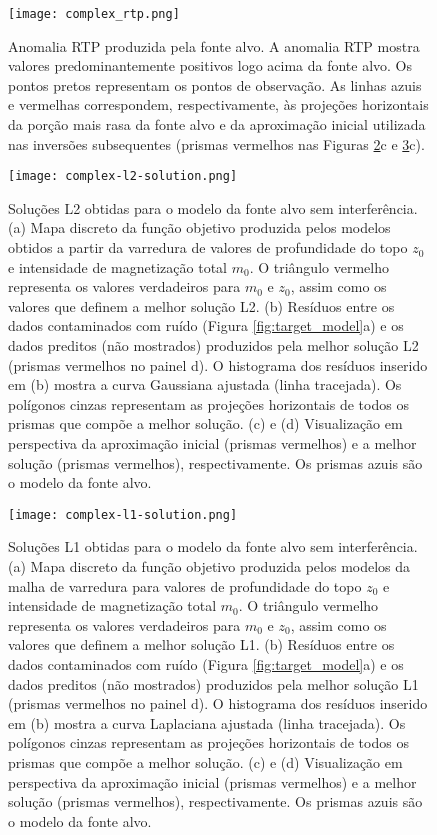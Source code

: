 \begin{figure}[!htb]
	\centering
	\texttt{[image: complex\_rtp.png]}
	\caption{Anomalia RTP produzida pela fonte alvo. 
		A anomalia RTP mostra valores predominantemente positivos logo acima da fonte alvo. Os pontos pretos representam os pontos de observação. As linhas azuis e vermelhas correspondem, respectivamente, às projeções horizontais da porção mais rasa da fonte alvo e da aproximação inicial utilizada nas inversões subsequentes (prismas vermelhos nas Figuras \ref{fig:target_l2_result}c e 
		\ref{fig:target_l1_result}c).
	}
	\label{fig:target_model_rtp}
\end{figure}

\pagebreak

\begin{figure}[!htb]
	\centering
	\texttt{[image: complex-l2-solution.png]}
	\caption{Soluções L2 obtidas para o modelo da fonte alvo sem interferência. 
		(a) Mapa discreto da função objetivo produzida pelos modelos obtidos a partir da varredura de valores de profundidade do topo $z_{0}$ e intensidade de magnetização total $m_{0}$. 
		O triângulo vermelho representa os valores verdadeiros para $m_{0}$ e $z_{0}$, assim como os valores que definem a melhor solução L2.
		(b) Resíduos entre os dados contaminados com ruído (Figura \ref{fig:target_model}a) 
		e os dados preditos (não mostrados) produzidos pela melhor solução L2 (prismas vermelhos no painel d). 
		O histograma dos resíduos inserido em (b) mostra a curva Gaussiana ajustada (linha tracejada).
		Os polígonos cinzas representam as projeções horizontais de todos os prismas que compõe a melhor solução. 
		(c) e (d) Visualização em perspectiva da aproximação inicial (prismas vermelhos) e 
		a melhor solução (prismas vermelhos), respectivamente. Os prismas azuis são o modelo da fonte alvo. 
	}
	\label{fig:target_l2_result}
\end{figure}
\pagebreak
\begin{figure}[!htb]
	\centering
	\texttt{[image: complex-l1-solution.png]}
	\caption{Soluções L1 obtidas para o modelo da fonte alvo sem interferência. 
		(a) Mapa discreto da função objetivo produzida pelos modelos da malha de varredura para valores de profundidade do topo $z_{0}$ e intensidade de magnetização total $m_{0}$. 
		O triângulo vermelho representa os valores verdadeiros para $m_{0}$ e $z_{0}$, assim como os valores que definem a melhor solução L1.
		(b) Resíduos entre os dados contaminados com ruído (Figura \ref{fig:target_model}a) 
		e os dados preditos (não mostrados) produzidos pela melhor solução L1 (prismas vermelhos no painel d). 
		O histograma dos resíduos inserido em (b) mostra a curva Laplaciana ajustada (linha tracejada).
		Os polígonos cinzas representam as projeções horizontais de todos os prismas que compõe a melhor solução. 
		(c) e (d) Visualização em perspectiva da aproximação inicial (prismas vermelhos) e 
		a melhor solução (prismas vermelhos), respectivamente. Os prismas azuis são o modelo da fonte alvo. 
	}
	\label{fig:target_l1_result}
\end{figure}
\pagebreak


